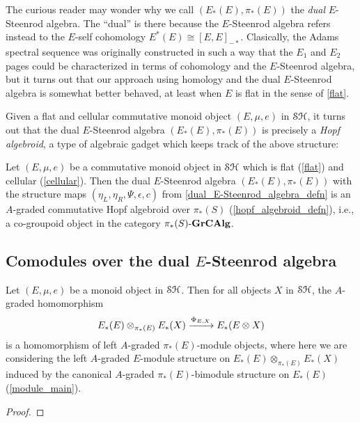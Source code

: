 \documentclass[../main.tex]{subfiles}
\begin{document}
The curious reader may wonder why we call $(E_*(E),\pi_*(E))$ the \emph{dual} $E$-Steenrod algebra. The ``dual'' is there because the $E$-Steenrod algebra refers instead to the $E$-self cohomology $E^*(E)\cong [E,E]_{-*}$. Clasically, the Adams spectral sequence was originally constructed in such a way that the $E_1$ and $E_2$ pages could be characterized in terms of cohomology and the $E$-Steenrod algebra, but it turns out that our approach using homology and the dual $E$-Steenrod algebra is somewhat better behaved, at least when $E$ is flat in the sense of \autoref{flat}.

Given a flat and cellular commutative monoid object $(E,\mu,e)$ in $\mathcal{SH}$, it turns out that the dual $E$-Steenrod algebra $(E_*(E),\pi_*(E))$ is precisely a \emph{Hopf algebroid}, a type of algebraic gadget which keeps track of the above structure:

\begin{proposition}\label{dual_E-Steenrod_algebra_is_a_Hopf_algebroid_main}
    Let $(E,\mu,e)$ be a commutative monoid object in $\mathcal{SH}$ which is flat (\autoref{flat}) and cellular (\autoref{cellular}). Then the dual $E$-Steenrod algebra $(E_*(E),\pi_*(E))$ with the structure maps $(\eta_L,\eta_R,\Psi,\epsilon,c)$ from \autoref{dual_E-Steenrod_algebra_defn} is an $A$-graded commutative Hopf algebroid over $\pi_*(S)$ (\autoref{hopf_algebroid_defn}), i.e., a co-groupoid object in the category ${\pi_*(S)}\text-\mathbf{GrCAlg}$.
\end{proposition}

\subsection{Comodules over the dual \texorpdfstring{$E$}{E}-Steenrod algebra}\label{subsection:E-Steenrod_comodules}

\begin{lemma}\label{Phi_E,X_is_left_pi*E-module_homo_main}
    Let $(E,\mu,e)$ be a monoid object in $\mathcal{SH}$. Then for all objects $X$ in $\mathcal{SH}$, the $A$-graded homomorphism
    \[E_*(E)\otimes_{\pi_*(E)}E_*(X)\xrightarrow{\Phi_{E,X}}E_*(E\otimes X)\]
    is a homomorphism of left $A$-graded $\pi_*(E)$-module objects, where here we are considering the left $A$-graded $E$-module structure on $E_*(E)\otimes_{\pi_*(E)}E_*(X)$ induced by the canonical $A$-graded $\pi_*(E)$-bimodule structure on $E_*(E)$ (\autoref{module_main}).
\end{lemma}
\begin{proof}
\end{proof}
\end{document}
